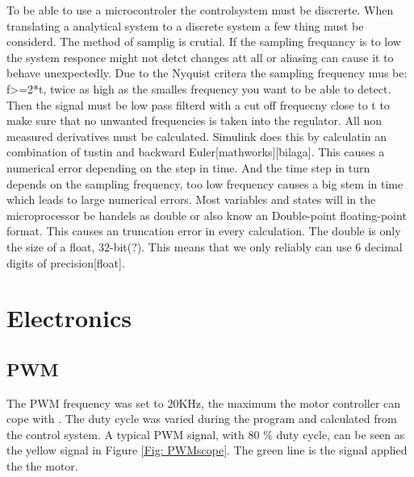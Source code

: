 \documentclass[a4paper,11pt]{kth-mag}
\begin{document}
To be able to use a microcontroler the controlsystem must be discrerte. When translating a analytical system to a 
discrete system a few thing must be considerd. The method of samplig is crutial. If the sampling frequancy is to 
low the system responce might not detct changes att all or aliasing can cause it to behave unexpectedly. Due to the 
Nyquist critera the sampling frequency mus be: f>=2*t, twice as high as the smalles frequency you want to be able to
detect. Then the signal must be low pass filterd with a cut off frequecny close to t to make sure that no unwanted
frequencies is taken into the regulator.
All non measured derivatives must be calculated. Simulink does this by calculatin an combination of tustin and 
backward Euler[mathworks][bilaga]. This causes a numerical error depending on the step in time. And the time step
in turn depends on the sampling frequency, too low frequency causes a big stem in time which leads to large numerical 
errors.
Most variables and states will in the microprocessor be handels as double or also know an Double-point floating-point
format. This causes an truncation error in every calculation. The double is only the size of a float, 32-bit(?). This
means that we only reliably can use 6 decimal digits of precision[float].

\section{Electronics}



\subsection{PWM}
The PWM frequency was set to 20KHz, the maximum the motor controller can cope with \cite{MC33926}. The duty cycle was varied during the program and calculated from the control system. A typical PWM signal, with 80 \%  duty cycle, can be seen as the yellow signal in Figure \ref{Fig: PWMscope}. The green line is the signal applied the the motor.
\end{document}
